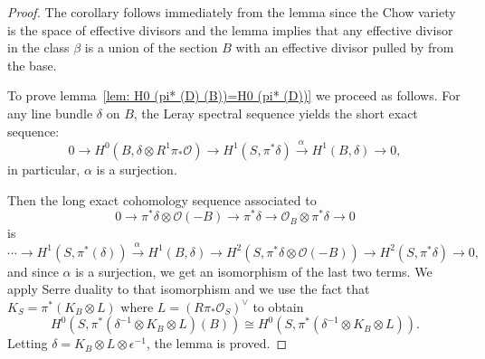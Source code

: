 \documentclass{amsart}
\theoremstyle{definition}
\renewcommand{\O}{\mathcal{O}}
\newcommand{\rt}[1]{\stackrel{#1\,}{\rightarrow}}
\newcommand{\Rt}[1]{\stackrel{#1\,}{\longrightarrow}}
\begin{document}
\begin{proof}
The corollary follows immediately from the lemma since the Chow
variety is the space of effective divisors and the lemma implies that
any effective divisor in the class $\beta $ is a union of the section
$B$ with an effective divisor pulled by from the base.

To prove lemma~\ref{lem: H0 (pi* (D) (B))=H0 (pi* (D))} we proceed as
follows. For any line bundle $\delta $ on $B$, the Leray spectral
sequence yields the short exact sequence:
\[
0\to H^{0} (B,\delta \otimes R^{1}\pi _{*}\O )\to H^{1} (S,\pi ^{*}\delta )\Rt{\alpha } H^{1} (B,\delta )\to 0,
\]
in particular, $\alpha $ is a surjection.

Then the long exact cohomology sequence associated to 
\[
0\to \pi ^{*}\delta \otimes \O (-B)\to \pi ^{*}\delta \to \O _{B}\otimes \pi ^{*}\delta \to 0
\]
is
\[
\dotsb \to H^{1} (S,\pi ^{*} (\delta ))\rt{\alpha }H^{1} (B,\delta )\to H^{2} (S,\pi ^{*}\delta \otimes \O (-B))\to H^{2} (S,\pi ^{*}\delta )\to 0,
\]
and since $\alpha $ is a surjection, we get an isomorphism of the last
two terms. We apply Serre duality to that isomorphism and we use the
fact that $K_{S} = \pi ^{*} (K_{B}\otimes L)$ where $L = \left(R\pi
_{*}\O _{S} \right)^{\vee }$ \cite[prop?]{Fr-Mo} to obtain
\[
H^{0} (S,\pi ^{*} (\delta ^{-1}\otimes K_{B}\otimes L) (B)) \cong H^{0}(S,\pi ^{*} (\delta ^{-1}\otimes K_{B}\otimes L)).
\]
Letting $\delta =K_{B}\otimes L\otimes \epsilon ^{-1}$, the lemma is
proved.
\end{proof}


     


\end{document}
